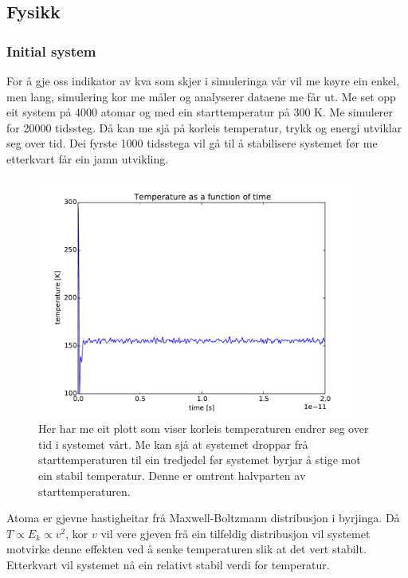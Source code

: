 \documentclass[12pt, a4paper]{article}
\theoremstyle{definition} \newtheorem*{definition}{Teorem}
\begin{document}
    \subsection*{Fysikk}

        \subsubsection*{Initial system}
            For å gje oss indikator av kva som skjer i simuleringa vår vil me køyre ein enkel, men lang, simulering kor me måler og analyserer dataene me får ut.
            Me set opp eit system på 4000 atomar og med ein starttemperatur på 300 K. Me simulerer for 20000 tidssteg.
            Då kan me sjå på korleis temperatur, trykk og energi utviklar seg over tid. Dei fyrste 1000 tidsstega vil gå til å stabilisere systemet før me 
            etterkvart får ein jamn utvikling.
            \begin{figure}[H]
                \centering
                \includegraphics[width=400px]{temperature.pdf}
                \caption{Her har me eit plott som viser korleis temperaturen endrer seg over tid i systemet vårt. Me kan sjå at systemet droppar frå starttemperaturen til
                         ein tredjedel før systemet byrjar å stige mot ein stabil temperatur. Denne er omtrent halvparten av starttemperaturen.}
            \end{figure}
            Atoma er gjevne hastigheitar frå Maxwell-Boltzmann distribusjon i byrjinga. Då $T \propto E_k \propto v^2$, kor $v$ vil vere gjeven frå ein tilfeldig distribusjon
            vil systemet motvirke denne effekten ved å senke temperaturen slik at det vert stabilt. Etterkvart vil systemet nå ein relativt stabil verdi for temperatur. 
\end{document}
